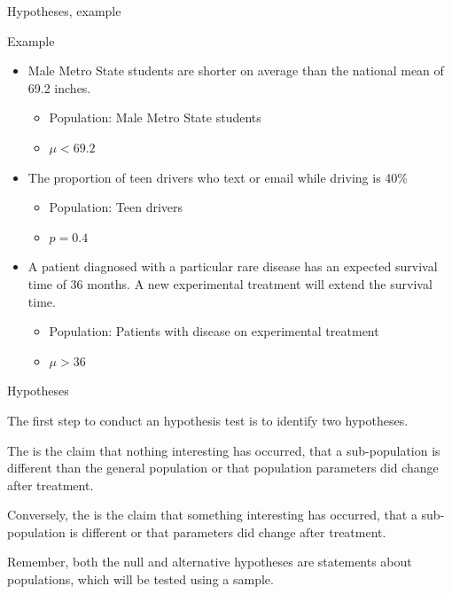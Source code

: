 \documentclass[xcolor=table, aspectratio=169, bigger]{beamer}
\begin{document}
\begin{frame}{Hypotheses, example}
\begin{exampleblock}{Example}
\begin{itemize}
\item Male Metro State students are shorter on average than the national mean of 69.2 inches.
\begin{itemize}
\pause\item Population: Male Metro State students
\pause\item $\mu < 69.2$
\end{itemize}

\pause\item The proportion of teen drivers who text or email while driving is 40\%
\begin{itemize}
\pause\item Population: Teen drivers
\pause\item $p = 0.4$
\end{itemize}

\pause\item A patient diagnosed with a particular rare disease has an expected survival time of 36 months. A new experimental treatment will extend the survival time.
\begin{itemize}
\pause\item Population: Patients with disease on experimental treatment
\pause\item $\mu > 36$
\end{itemize}
\end{itemize}
\end{exampleblock}
\end{frame}

\begin{frame}{Hypotheses}
\begin{block}{}
The first step to conduct an hypothesis test is to identify two hypotheses.
\end{block}
\pause
\begin{block}{}
The  is the claim that nothing interesting has occurred, that a sub-population is  different than the general population or that population parameters did  change after treatment.
\end{block}
\pause
\begin{block}{} 
Conversely, the  is the claim that something interesting has occurred, that a sub-population is different or that parameters did change after treatment.
\end{block}
\pause
\begin{block}{}
Remember, both the null and alternative hypotheses are statements about populations, which will be tested using a sample.
\end{block}
\end{frame}
\end{document}
